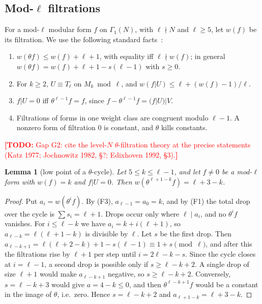 \documentclass[11pt]{amsart}
\newcommand{\w}{w}
\newcommand{\TODO}[1]{\textcolor{red}{\textbf{[TODO:} #1\textbf{]}}}
\theoremstyle{plain}
\newtheorem{lemma}[theorem]{Lemma}
\theoremstyle{definition}
\numberwithin{equation}{section}
\begin{document}
\subsection{Mod-$\ell$ filtrations}
For a mod-$\ell$ modular form $f$ on $\Gamma_1(N)$, with $\ell\nmid N$ and $\ell\ge5$, let $\w(f)$ be its filtration. We use the
following standard facts~\cite{SerreBourbaki1973,SwinnertonDyer1973,Katz1977,Jochnowitz1982}:
\begin{enumerate}[label=(F\arabic*)]
\item $\w(\theta f)\le \w(f)+\ell+1$, with equality iff $\ell\nmid \w(f)$; in general
  $\w(\theta f)=\w(f)+\ell+1-s(\ell-1)$ with $s\ge0$.
\item For $k\ge2$, $U\equiv T_\ell$ on $M_k\bmod\ell$, and $\w(f|U)\le\ell+(\w(f)-1)/\ell$.
\item $f|U=0$ iff $\theta^{\ell-1}f=f$, since $f-\theta^{\ell-1}f=(f|U)|V$.
\item Filtrations of forms in one weight class are congruent modulo $\ell-1$. A nonzero form of filtration $0$ is constant,
  and $\theta$ kills constants.
\end{enumerate}
\TODO{Gap G2: cite the level-$N$ $\theta$-filtration theory at the precise statements (Katz 1977; Jochnowitz 1982, \S?;
Edixhoven 1992, \S3).}

\begin{lemma}[low point of a $\theta$-cycle]\label{lem:T}
Let $5\le k\le\ell-1$, and let $f\neq0$ be a mod-$\ell$ form with $\w(f)=k$ and $f|U=0$. Then $\w(\theta^{\ell+1-k}f)=\ell+3-k$.
\end{lemma}
\begin{proof}
Put $a_i=\w(\theta^if)$. By (F3), $a_{\ell-1}=a_0=k$, and by (F1) the total drop over the cycle is $\sum s_i=\ell+1$. Drops
occur only where $\ell\mid a_i$, and no $\theta^if$ vanishes. For $i\le\ell-k$ we have $a_i=k+i(\ell+1)$, so
$a_{\ell-k}=\ell(\ell+1-k)$ is divisible by $\ell$. Let $s$ be the first drop. Then $a_{\ell-k+1}=\ell(\ell+2-k)+1-s(\ell-1)\equiv1+s\pmod\ell$,
and after this the filtrations rise by $\ell+1$ per step until $i=2\ell-k-s$. Since the cycle closes at $i=\ell-1$, a second
drop is possible only if $s\ge\ell-k+2$. A single drop of size $\ell+1$ would make $a_{\ell-k+1}$ negative, so
$s\ge\ell-k+2$. Conversely, $s=\ell-k+3$ would give $a=4-k\le0$, and then $\theta^{\ell-k+1}f$ would be a constant in the image
of $\theta$, i.e.\ zero. Hence $s=\ell-k+2$ and $a_{\ell+1-k}=\ell+3-k$.
\end{proof}
\end{document}
